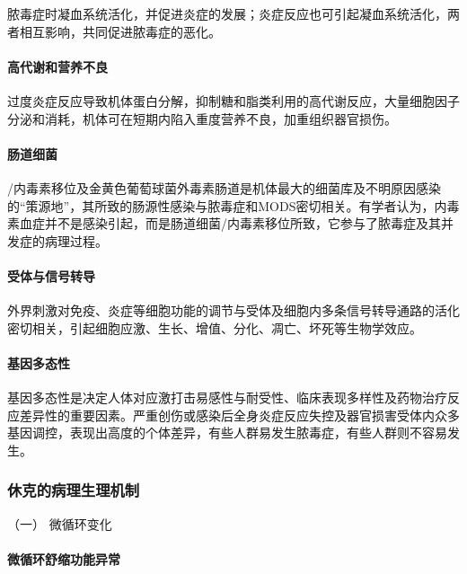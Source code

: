 脓毒症时凝血系统活化，并促进炎症的发展；炎症反应也可引起凝血系统活化，两者相互影响，共同促进脓毒症的恶化。

\paragraph{高代谢和营养不良}

过度炎症反应导致机体蛋白分解，抑制糖和脂类利用的高代谢反应，大量细胞因子分泌和消耗，机体可在短期内陷入重度营养不良，加重组织器官损伤。

\paragraph{肠道细菌}

/内毒素移位及金黄色葡萄球菌外毒素肠道是机体最大的细菌库及不明原因感染的“策源地”，其所致的肠源性感染与脓毒症和MODS密切相关。有学者认为，内毒素血症并不是感染引起，而是肠道细菌/内毒素移位所致，它参与了脓毒症及其并发症的病理过程。

\paragraph{受体与信号转导}

外界刺激对免疫、炎症等细胞功能的调节与受体及细胞内多条信号转导通路的活化密切相关，引起细胞应激、生长、增值、分化、凋亡、坏死等生物学效应。

\paragraph{基因多态性}

基因多态性是决定人体对应激打击易感性与耐受性、临床表现多样性及药物治疗反应差异性的重要因素。严重创伤或感染后全身炎症反应失控及器官损害受体内众多基因调控，表现出高度的个体差异，有些人群易发生脓毒症，有些人群则不容易发生。

\subsubsection{休克的病理生理机制}

\hypertarget{text00057.htmlux5cux23CHP2-2-1-3-1}{}
（一） 微循环变化

\paragraph{微循环舒缩功能异常}

